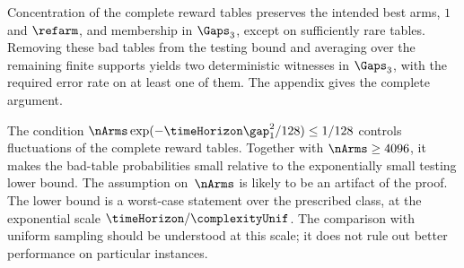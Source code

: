 Concentration of the complete reward tables preserves the intended
best arms, $1$ and $\refarm$, and membership in $\Gaps_3$, except on
sufficiently rare tables. Removing these bad tables from the testing
bound and averaging over the remaining finite supports yields two
deterministic witnesses in $\Gaps_3$, with the required error rate
on at least one of them. The appendix gives the complete argument.

\begin{remark}
The condition
$\nArms\exp(-\timeHorizon\gap_1^2/128)\leq1/128$ controls
fluctuations of the complete reward tables. Together with
$\nArms\geq4096$, it makes the bad-table probabilities small relative
to the exponentially small testing lower bound.
	The assumption on~$\nArms$ is
	likely to be an artifact of the proof.
The lower bound is a worst-case statement over the prescribed class,
at the exponential scale $\timeHorizon/\complexityUnif$.
The comparison with uniform sampling should be understood at this
scale; it does not rule out better performance on particular instances.
\end{remark}%